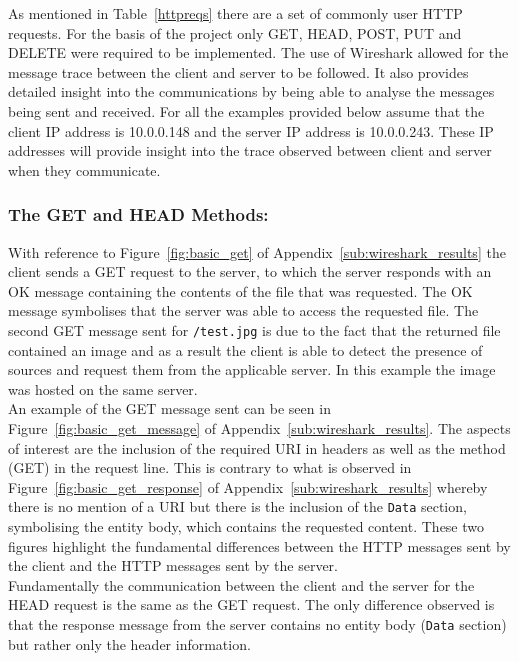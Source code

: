 \documentclass[10pt,twocolumn]{witseiepaper}
\begin{document}
		As mentioned in Table~\ref{httpreqs} there are a set of commonly user HTTP requests. For the basis of the project only GET, HEAD, POST, PUT and DELETE were required to be implemented. The use of Wireshark allowed for the message trace between the client and server to be followed. It also provides detailed insight into the communications by being able to analyse the messages being sent and received. For all the examples provided below assume that the client IP address is 10.0.0.148 and the server IP address is 10.0.0.243. These IP addresses will provide insight into the trace observed between client and server when they communicate.
		
		\subsubsection*{The GET and HEAD Methods:} With reference to Figure~\ref{fig:basic_get} of Appendix~\ref{sub:wireshark_results} the client sends a GET request to the server, to which the server responds with an OK message containing the contents of the file that was requested. The OK message symbolises that the server was able to access the requested file. The second GET message sent for \texttt{/test.jpg} is due to the fact that the returned file contained an image and as a result the client is able to detect the presence of sources and request them from the applicable server. In this example the image was hosted on the same server. \\
		
		An example of the GET message sent can be seen in Figure~\ref{fig:basic_get_message} of Appendix~\ref{sub:wireshark_results}. The aspects of interest are the inclusion of the required URI in headers as well as the method (GET) in the request line. This is contrary to what is observed in Figure~\ref{fig:basic_get_response} of Appendix~\ref{sub:wireshark_results} whereby there is no mention of a URI but there is the inclusion of the \texttt{Data} section, symbolising the entity body, which contains the requested content. These two figures highlight the fundamental differences between the HTTP messages sent by the client and the HTTP messages sent by the server. \\
		
		Fundamentally the communication between the client and the server for the HEAD request is the same as the GET request. The only difference observed is that the response message from the server contains no entity body (\texttt{Data} section) but rather only the header information. 
		
\end{document}
